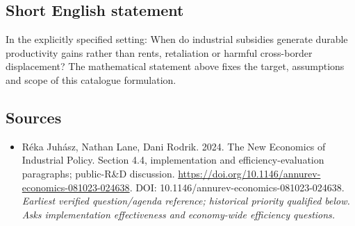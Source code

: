 \documentclass[11pt]{article}
\begin{document}
\subsection{Short English statement}
In the explicitly specified setting: When do industrial subsidies generate durable productivity gains rather than rents, retaliation or harmful cross-border displacement? The mathematical statement above fixes the target, assumptions and scope of this catalogue formulation.

\subsection{Sources}
\begin{itemize}\raggedright
\item[\textnormal{[S1]}]\hypertarget{source:30007628:1}{} Réka Juhász, Nathan Lane, Dani Rodrik. 2024. The New Economics of Industrial Policy. Section 4.4, implementation and efficiency-evaluation paragraphs; public-R\&D discussion.
\url{https://doi.org/10.1146/annurev-economics-081023-024638}.
DOI: 10.1146/annurev-economics-081023-024638.
{\small\textit{Earliest verified question/agenda reference; historical priority qualified below. Asks implementation effectiveness and economy-wide efficiency questions.}}
\end{itemize}
\end{document}
